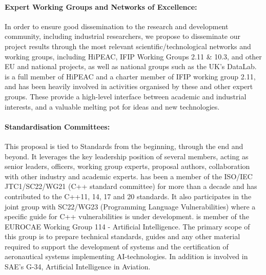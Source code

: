 \documentclass[a4paper,11pt]{article}
\begin{document}
 \paragraph{Expert Working Groups and Networks of Excellence:}
In order to ensure good dissemination to the research and development
community, including industrial researchers, we propose to disseminate
our project results through the most relevant scientific/technological
networks and working groups, including HiPEAC, %
IFIP Working Groups 2.11 \& 10.3, and other EU and national projects,
as well as national groups such as the UK's DataLab.
\SAshort{} is a full member of HiPEAC and a charter member of IFIP working
group 2.11, and has been heavily involved in activities organised by these and other expert groups.
These provide a high-level interface between academic and industrial interests, and a valuable
melting pot for ideas and new technologies. 

\paragraph{Standardisation Committees:}
This proposal is tied to Standards from the beginning, through the end and beyond. It leverages the key leadership position of several members, acting as senior leaders, officers, working group experts, proposal authors, collaboration with other industry and academic experts.
\UCMshort{} has been a member of the ISO/IEC JTC1/SC22/WG21 (C++ standard committee) for more than a decade and has contributed to the C++11, 14, 17 and 20 standards. It also participates in the joint group with SC22/WG23 (Programming Language Vulnerabilities) where a specific guide for C++ vulnerabilities is under development.
\FRQshort{} is member of the EUROCAE Working Group 114 - Artificial Intelligence. The primary scope of this group is to prepare technical standards, guides and any other material required to support the development of systems and the certification of aeronautical systems implementing AI-technologies. In addition \FRQshort{} is involved in SAE's G-34, Artificial Intelligence in Aviation.

%
%
\end{document}
